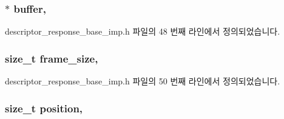 \subsubsection[{\texorpdfstring{buffer}{buffer}}]{$\ast$ buffer\hspace{0.3cm}{\ttfamily [protected]}, {\ttfamily [inherited]}}\hypertarget{classavdecc__lib_1_1descriptor__response__base__imp_a56ed84df35de10bdb65e72b184309497}{}\label{classavdecc__lib_1_1descriptor__response__base__imp_a56ed84df35de10bdb65e72b184309497}


descriptor\+\_\+response\+\_\+base\+\_\+imp.\+h 파일의 48 번째 라인에서 정의되었습니다.

\subsubsection[{\texorpdfstring{frame\+\_\+size}{frame_size}}]{\setlength{\rightskip}{0pt plus 5cm}size\+\_\+t frame\+\_\+size\hspace{0.3cm}{\ttfamily [protected]}, {\ttfamily [inherited]}}\hypertarget{classavdecc__lib_1_1descriptor__response__base__imp_affd041a595cabab98275245b9cb2824d}{}\label{classavdecc__lib_1_1descriptor__response__base__imp_affd041a595cabab98275245b9cb2824d}


descriptor\+\_\+response\+\_\+base\+\_\+imp.\+h 파일의 50 번째 라인에서 정의되었습니다.

\subsubsection[{\texorpdfstring{position}{position}}]{\setlength{\rightskip}{0pt plus 5cm}size\+\_\+t position\hspace{0.3cm}{\ttfamily [protected]}, {\ttfamily [inherited]}}\hypertarget{classavdecc__lib_1_1descriptor__response__base__imp_a7a04afe5347934be732ec70a70bd0a28}{}\label{classavdecc__lib_1_1descriptor__response__base__imp_a7a04afe5347934be732ec70a70bd0a28}


